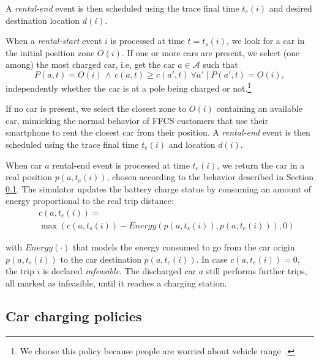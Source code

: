 A \emph{rental-end} event is then scheduled using the trace final time $t_{e}(i)$ and desired destination location $d(i)$.

When a \emph{rental-start} event $i$ is processed at time $t=t_{s}(i)$, we look for a car in the initial position zone $O(i)$. If one or more cars are present, we select (one among) the most charged car, i.e, get the car $a\in \mathcal{A}$ such that
\[
P(a,t) = O(i) \, \land \, c(a,t) \geq c(a',t)\ \forall a'\mid P(a',t) = O(i),
\]
independently whether the car is at a pole being charged or not.\footnote{We choose this policy because people are worried about vehicle range~\cite{RangeAnxiety}.}


If no car is present, we select the closest zone to $O(i)$ containing an available car, mimicking the normal behavior of FFCS customers that use their smartphone to rent the closest car from their position.
A \emph{rental-end} event is then scheduled using the trace final time $t_{e}(i)$ and location $d(i)$.

When car $a$ rental-end event is processed at time $t_{e}(i)$, we return the car in a real position $p(a,t_{e}(i))$, chosen according to the behavior described in Section \ref{subsec:policies}. The simulator updates the battery charge status by consuming an amount of energy proportional to the real trip distance:
\begin{eqnarray*}
	&& c(a,t_{e}(i)) = \nonumber
	 \\
	&& \hspace{0cm}   \max{(c(a,t_{s}(i)) - Energy(p(a,t_{s}(i)), p(a,t_{e}(i))), 0)} 
\end{eqnarray*}

with $Energy(\cdot)$ that models the energy consumed to go from the car origin $p(a,t_{s}(i))$ to the car destination $p(a,t_{e}(i))$.
In case $c(a,t_{e}(i)) = 0$, the trip $i$ is declared {\it infeasible}. 
The discharged car $a$ still performs further trips, all marked as infeasible, until it reaches a charging station.

\subsection{Car charging policies}
\label{subsec:policies}


